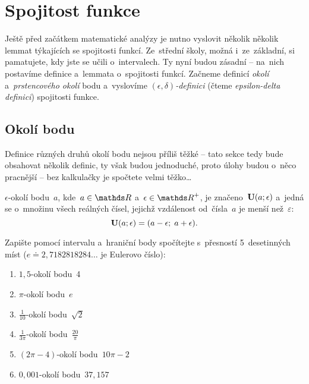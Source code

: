 \section{Spojitost funkce}
\label{sec:funkce-spojitost}

Ještě před začátkem matematické analýzy je nutno vyslovit několik několik lemmat
týkajících se spojitosti funkcí.
Ze~střední školy, možná i~ze~základní, si pamatujete, kdy jste se učili o~intervalech.
Ty nyní budou zásadní -- na~nich postavíme definice a~lemmata o~spojitosti funkcí.
Začneme definicí \emph{okolí} a~\emph{prstencového okolí} bodu a~vyslovíme
\emph{${(\epsilon, \delta)}$-definici} (čteme \emph{epsilon-delta definici})
spojitosti funkce.

\subsection{Okolí bodu}
\label{subsec:limita-spojitost-okoli}

Definice různých druhů okolí bodu nejsou příliš těžké -- tato sekce tedy bude
obsahovat několik definic, ty však budou jednoduché, proto úlohy budou o~něco
pracnější -- bez kalkulačky je spočtete velmi těžko\ldots

\begin{definition}
    $\epsilon$-okolí bodu~$a$, kde~${a \in \reals}$
    a~${\epsilon \in \positive{\reals}}$, je značeno~${\mathbf{U}(a; \epsilon)}$
    a~jedná se o~množinu všech reálných čísel, jejichž vzdálenost od~čísla~$a$ je
    menší než~$\varepsilon$:
    \begin{equation*}
        \mathbf{U}(a; \epsilon) = (a - \epsilon;\; a + \epsilon).
    \end{equation*}
\end{definition}

\begin{exercise}
    Zapište pomocí intervalu a~hraniční body spočítejte s~přesností 5~desetinných
    míst (${e \doteq 2,7182818284\dots}$ je Eulerovo číslo):
    \begin{multicols}{2}
        \begin{enumerate}[label=(\alph*)]
            \item $1,5$-okolí bodu~4
            \item $\pi$-okolí bodu~$e$
            \item $\frac{1}{10}$-okolí bodu~$\sqrt{2}$
            \item $\frac{1}{3\pi}$-okolí bodu~$\frac{20}{\pi}$
            \item ${(2\pi - 4)}$-okolí bodu~${10\pi - 2}$
            \item $0,001$-okolí bodu~$37,157$
        \end{enumerate}
    \end{multicols}
\end{exercise}

